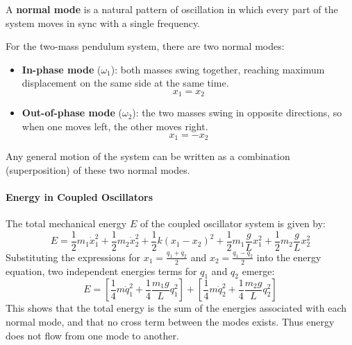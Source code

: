 \documentclass[11pt]{report}
\begin{document}
\begin{definition}
    A \textbf{normal mode} is a natural pattern of oscillation in which every part of the system moves in sync with a single frequency. 

    For the two-mass pendulum system, there are two normal modes:
    \begin{itemize}
        \item \textbf{In-phase mode} (\(\omega_1\)): both masses swing together, reaching maximum displacement on the same side at the same time.  
        $$
        x_1 = x_2
        $$
        
        \item \textbf{Out-of-phase mode} (\(\omega_2\)): the two masses swing in opposite directions, so when one moves left, the other moves right.  
        $$
        x_1 = -x_2
        $$
    \end{itemize}

    Any general motion of the system can be written as a combination (superposition) of these two normal modes.
\end{definition}
\paragraph{Energy in Coupled Oscillators} The total mechanical energy \( E \) of the coupled oscillator system is given by:
$$
    E = \frac{1}{2}m_1\dot{x}_1^2 + \frac{1}{2}m_2\dot{x}_2^2 + \frac{1}{2}k(x_1 - x_2)^2 + \frac{1}{2}m_1\frac{g}{L}x_1^2 + \frac{1}{2}m_2\frac{g}{L}x_2^2
$$
Substituting the expressions for \( x_1 = \frac{q_1 + q_2}{2} \) and \( x_2 = \frac{q_1 - q_2}{2} \) into the energy equation, two independent energies terms for $q_1$ and $q_2$ emerge:
$$
    E = \left[ \frac{1}{4} m \dot{q}_1^2 + \frac{1}{4}\frac{m_1 g}{L} q_1^2 \right] + \left[ \frac{1}{4} m \dot{q}_2^2 + \frac{1}{4}\frac{m_2 g}{L} q_2^2 \right]
$$
This shows that the total energy is the sum of the energies associated with each normal mode, and that no cross term between the modes exists. Thus energy does not flow from one mode to another.
\end{document}
